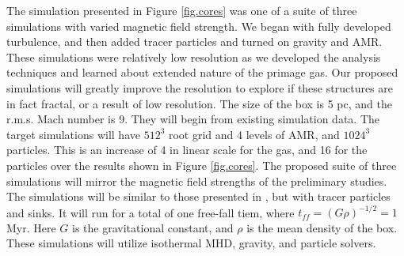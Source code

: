 The simulation presented in Figure \ref{fig.cores} was one of a suite of three
simulations with varied magnetic field strength.  We began with fully developed
turbulence, and then added tracer particles and turned on gravity and AMR.  These simulations were
relatively low resolution as we developed the analysis techniques and learned
about extended nature of the primage gas.
Our proposed simulations will greatly improve the resolution
to explore if these structures are in fact fractal, or a result of low
resolution. The size of the box is 5 pc, and the r.m.s. Mach number is 9.  They
will begin from existing simulation data.  The target simulations will have $512^3$ root grid and 4 levels of
AMR, and $1024^3$ particles.  This is an increase of 4 in linear scale for the
gas, and 16 for the particles over the results shown in Figure \ref{fig.cores}.
The proposed suite of three simulations will mirror the magnetic field strengths
of the preliminary studies.  The simulations will be similar to those presented
in \citep{Collins12}, but with tracer particles and sinks.
It will run for a total of one free-fall tiem, where $t_{ff}=(G
\rho)^{-1/2}=1$Myr.  Here
$G$ is the gravitational constant, and $\rho$ is the mean density of the box.
These simulations will utilize isothermal MHD, gravity, and particle solvers.

